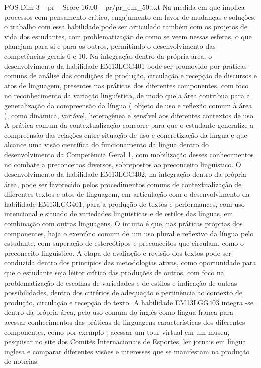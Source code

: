 \begin{textsample}{POS Dim 3 – pr – Score 16.00 – pr/pr\_em\_50.txt}
Na medida em que implica processos com pensamento crítico, engajamento em favor de mudanças e soluções, o trabalho com essa habilidade pode ser articulado também com os projetos de vida dos estudantes, com problematização de como se veem nessas esferas, o que planejam para si e para os outros, permitindo o desenvolvimento das competências gerais 6 e 10.
Na integração dentro da própria área, o desenvolvimento da habilidade EM13LGG401 pode ser promovido por práticas comuns de análise das condições de produção, circulação e recepção de discursos e atos de linguagem, presentes nas práticas dos diferentes componentes, com foco no reconhecimento da variação linguística, de modo que a área contribua para a generalização da compreensão da língua ( objeto de uso e reflexão comum à área ), como dinâmica, variável, heterogênea e sensível aos diferentes contextos de uso.
A prática comum da contextualização concorre para que o estudante generalize a compreensão das relações entre situação de uso e concretização da língua e que alcance uma visão científica do funcionamento da língua dentro do desenvolvimento da Competência Geral 1, com mobilização desses conhecimentos no combate a preconceitos diversos, sobrepostos ao preconceito linguístico.
O desenvolvimento da habilidade EM13LGG402, na integração dentro da própria área, pode ser favorecido pelos procedimentos comuns de contextualização de diferentes textos e atos de linguagem, em articulação com o desenvolvimento da habilidade EM13LGG401, para a produção de textos e performances, com uso intencional e situado de variedades linguísticas e de estilos das línguas, em combinação com outras linguagens.
O intuito é que, nas práticas próprias dos componentes, haja o exercício comum de um uso plural e reflexivo da língua pelo estudante, com superação de estereótipos e preconceitos que circulam, como o preconceito linguístico.
A etapa de avaliação e revisão dos textos pode ser conduzida dentro dos princípios das metodologias ativas, como oportunidade para que o estudante seja leitor crítico das produções de outros, com foco na problematização de escolhas de variedades e de estilos e indicação de outras possibilidades, dentro dos critérios de adequação e pertinência ao contexto de produção, circulação e recepção do texto.
A habilidade EM13LGG403 integra -se dentro da própria área, pelo uso comum do inglês como língua franca para acessar conhecimentos das práticas de linguagens características dos diferentes componentes, como por exemplo : acessar um tour virtual em um museu, pesquisar no site dos Comitês Internacionais de Esportes, ler jornais em língua inglesa e comparar diferentes visões e interesses que se manifestam na produção de notícias.

\end{textsample}
